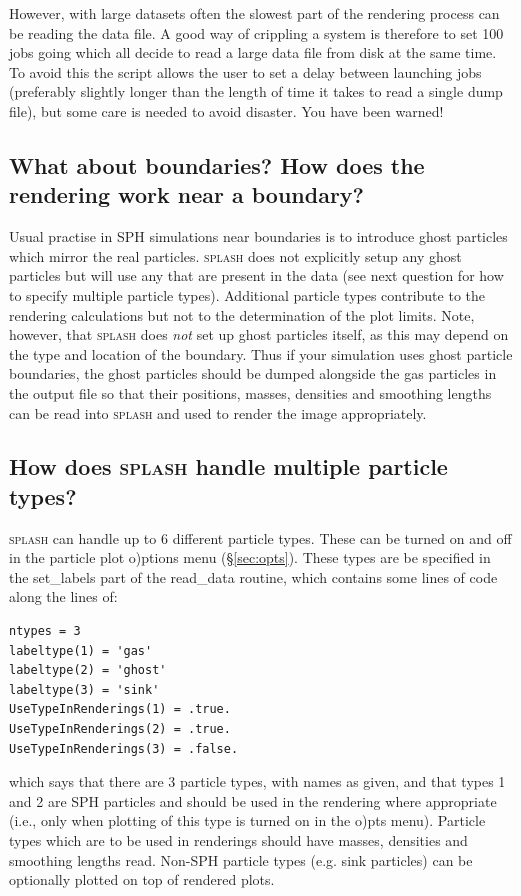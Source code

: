 \documentclass[a4paper,10pt]{article}
\newcommand{\splash}{\textsc{splash }}
\begin{document}
However, with large datasets often the slowest part of the rendering process can be reading the data file. A good way of crippling a system is therefore to set 100 jobs going which all decide to read a large data file from disk at the same time. To avoid this the script allows the user to set a delay between launching jobs (preferably slightly longer than the length of time it takes to read a single dump file), but some care is needed to avoid disaster. You have been warned! 

\subsection{What about boundaries? How does the rendering work near a boundary?}
 Usual practise in SPH simulations near boundaries is
to introduce ghost particles which mirror the real particles. \splash does not
explicitly setup any ghost particles but will use any that are present in the data
(see next question for how to specify multiple particle types). Additional particle types contribute
to the rendering calculations but not to the determination of the plot limits. Note,
however, that \splash does \emph{not} set up ghost particles itself, as this may depend
on the type and location of the boundary. Thus if your simulation uses ghost particle
boundaries, the ghost particles should be dumped alongside the gas particles in the
output file so that their positions, masses, densities and smoothing lengths can be
read into \splash and used to render the image appropriately.

\subsection{How does \splash handle multiple particle types?}
\splash can handle up to 6 different particle types. These can be turned on and off in the particle plot
o)ptions menu (\S\ref{sec:opts}). These types are be specified in the set\_labels part of the read\_data
routine, which contains some lines of code along the lines of:
\begin{verbatim}
ntypes = 3
labeltype(1) = 'gas'
labeltype(2) = 'ghost'
labeltype(3) = 'sink'
UseTypeInRenderings(1) = .true.
UseTypeInRenderings(2) = .true.
UseTypeInRenderings(3) = .false.
\end{verbatim}
which says that there are 3 particle types, with names as given, and that types 1 and 2 are SPH particles and
should be used in the rendering where appropriate (i.e., only when plotting of this type is turned on in the
o)pts menu). Particle types which are to be used in renderings should have masses, densities and smoothing
lengths read. Non-SPH particle types (e.g. sink particles) can be optionally plotted on top of rendered plots.
\end{document}
